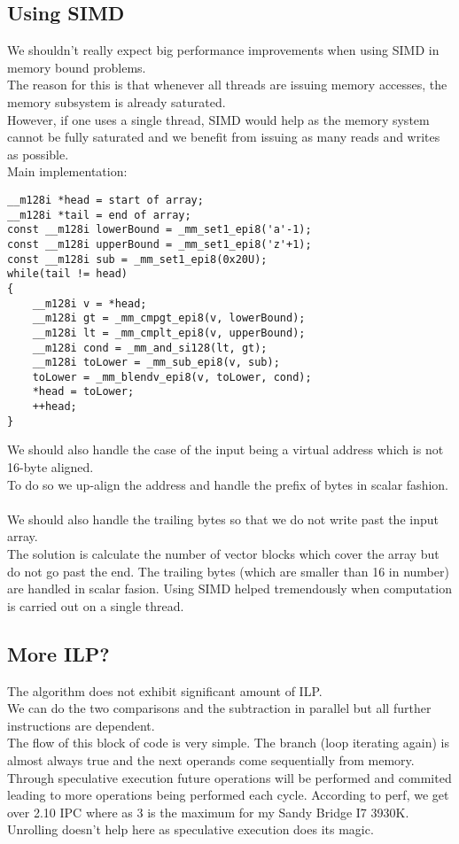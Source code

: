 \documentclass[10pt, fleqn]{article}
\begin{document}
\subsection{Using SIMD}
We shouldn't really expect big performance improvements when using SIMD in memory bound problems.\\
The reason for this is that whenever all threads are issuing memory accesses, the memory subsystem is already saturated.\\
However, if one uses a single thread, SIMD would help as the memory system cannot be fully saturated and we benefit from issuing as many reads and writes as possible.\\
\pagebreak
Main implementation:\\
\begin{lstlisting}
__m128i *head = start of array;
__m128i *tail = end of array;
const __m128i lowerBound = _mm_set1_epi8('a'-1);
const __m128i upperBound = _mm_set1_epi8('z'+1);
const __m128i sub = _mm_set1_epi8(0x20U);
while(tail != head)
{
    __m128i v = *head;
    __m128i gt = _mm_cmpgt_epi8(v, lowerBound);
    __m128i lt = _mm_cmplt_epi8(v, upperBound);
    __m128i cond = _mm_and_si128(lt, gt);
    __m128i toLower = _mm_sub_epi8(v, sub);
    toLower = _mm_blendv_epi8(v, toLower, cond);
    *head = toLower;
    ++head;
}
\end{lstlisting}
We should also handle the case of the input being a virtual address which is not 16-byte aligned.\\
To do so we up-align the address and handle the prefix of bytes in scalar fashion.\\\\
We should also handle the trailing bytes so that we do not write past the input array.\\
The solution is calculate the number of vector blocks which cover the array but do not go past the end. The trailing bytes (which are smaller than 16 in number) are handled in scalar fasion.
Using SIMD helped tremendously when computation is carried out on a single thread.

\subsection{More ILP?}
The algorithm does not exhibit significant amount of ILP.\\
We can do the two comparisons and the subtraction in parallel but all further instructions are dependent.\\
The flow of this block of code is very simple. The branch (loop iterating again) is almost always true and the next operands come sequentially from memory.\\
Through speculative execution future operations will be performed and commited leading to more operations being performed each cycle. According to perf, we get over 2.10 IPC where as 3 is the maximum for my Sandy Bridge I7 3930K.\\
Unrolling doesn't help here as speculative execution does its magic.
\end{document}
